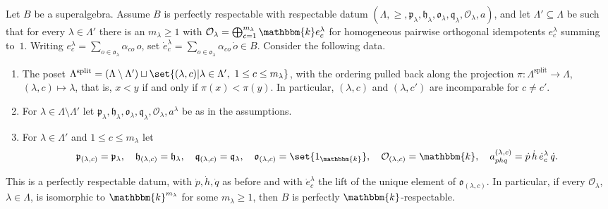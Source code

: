 \documentclass[a4paper,11pt]{amsart}
\numberwithin{equation}{subsection}
\theoremstyle{definition}
\theoremstyle{theorem}
\theoremstyle{remark}
\newcommand\CO{\mathcal{O}}
\newcommand\plam[1][\lambda]{\mathfrak{p}_{#1}}
\newcommand\hlam[1][\lambda]{\mathfrak{h}_{#1}}
\newcommand\qlam[1][\lambda]{\mathfrak{q}_{#1}}
\newcommand\Olam[1][\lambda]{\CO_{#1}}
\newcommand\olam[1][\lambda]{\mathfrak{o}_{#1}}
\newcommand\op{\operatorname}
\newcommand\kk{\mathbbm{k}}
\begin{document}
\begin{Theorem}\label{L:splitstratum}
  Let $B$ be a superalgebra. Assume $B$ is perfectly respectable with respectable datum
  $(\Lambda,\ge,\plam,\hlam,\olam,\qlam,\Olam,a)$, and let $\Lambda'\subseteq\Lambda$ be such
  that for every $\lambda\in\Lambda'$ there is an $m_\lambda\ge1$ with
  $\Olam=\bigoplus_{c=1}^{m_\lambda}\kk e^{\lambda}_{c}$ for homogeneous pairwise orthogonal idempotents
  $e^{\lambda}_{c}$ summing to~$1$.  Writing $e^{\lambda}_c=\sum_{o\in\olam}\alpha_{co}\,o$, set
  $\dot e^{\lambda}_c=\sum_{o\in\olam}\alpha_{co}\,\dot o\in B$. Consider the following data.
  \begin{enumerate}
  \item The poset $\Lambda^{\op{split}}=(\Lambda\setminus\Lambda')\sqcup
      \set{(\lambda,c)|\lambda\in\Lambda',\ 1\le c\le m_\lambda}$, with the ordering pulled
      back along the projection $\pi\colon\Lambda^{\op{split}}\to\Lambda$,
      $(\lambda,c)\mapsto\lambda$, that is, $x<y$ if and only if $\pi(x)<\pi(y)$. In
      particular, $(\lambda,c)$ and $(\lambda,c')$ are incomparable for $c\ne c'$.
  \item For $\lambda\in\Lambda\setminus\Lambda'$ let $\plam,\hlam,\olam,\qlam,\Olam,a^\lambda$
      be as in the assumptions.
  \item For $\lambda\in\Lambda'$ and $1\le c\le m_\lambda$ let
  \[
    \plam[(\lambda,c)]=\plam,\quad \hlam[(\lambda,c)]=\hlam,\quad
    \qlam[(\lambda,c)]=\qlam,\quad \olam[(\lambda,c)]=\set{1_\kk},\quad
    \Olam[(\lambda,c)]=\kk,\quad
    a^{(\lambda,c)}_{phq}=\dot p\,\dot h\,\dot e^{\lambda}_c\,\dot q .
  \]
  \end{enumerate}
  This is a perfectly respectable datum, with $\dot p,\dot h,\dot q$ as before and with
  $\dot e^{\lambda}_c$ the lift of the unique element of $\olam[(\lambda,c)]$. In particular,
  if every $\Olam$, $\lambda\in\Lambda$, is isomorphic to $\kk^{m_\lambda}$ for some
  $m_\lambda\ge1$, then $B$ is perfectly $\kk$-respectable.
\end{Theorem}
\end{document}
